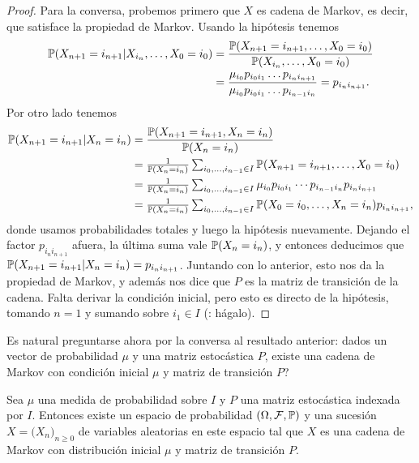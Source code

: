 \begin{proof}
Para la conversa, probemos primero que $X$ es cadena de Markov, es decir, que satisface la propiedad de Markov.
Usando la hipótesis tenemos
\begin{align}
\mathbb{P}(X_{n+1}=i_{n+1}|X_{i_n},\dotsc,X_0=i_0)&=\frac{\mathbb{P}(X_{n+1}=i_{n+1},\dotsc,X_0=i_0)}{\mathbb{P}(X_{i_n},\dotsc,X_0=i_0)}\\
&=\frac{\mu_{i_0}p_{i_0i_1}\dotsc p_{i_{n}i_{n+1}}}{\mu_{i_0}p_{i_0i_1}\dotsc p_{i_{n-1}i_n}}=p_{i_{n}i_{n+1}}.
\end{align}
Por otro lado tenemos
\begin{align}
\mathbb{P}(X_{n+1}=i_{n+1}|X_n=i_n)&=\frac{\mathbb{P}(X_{n+1}=i_{n+1},X_n=i_n)}{\mathbb{P}(X_n=i_n)}\\
&\textstyle=\frac1{\mathbb{P}(X_n=i_n)}\sum_{i_0,\dotsc,i_{n-1}\in I}\mathbb{P}(X_{n+1}=i_{n+1},\dotsc,X_0=i_0)\\
&\textstyle=\frac1{\mathbb{P}(X_n=i_n)}\sum_{i_0,\dotsc,i_{n-1}\in I}\mu_{i_0}p_{i_0i_1}\dotsm p_{i_{n-1}i_{n}}p_{i_{n}i_{n+1}}\\&
\textstyle=\frac1{\mathbb{P}(X_n=i_n)}\sum_{i_0,\dotsc,i_{n-1}\in I}\mathbb{P}(X_0=i_0,\dotsc,X_{n}=i_{n})p_{i_{n}i_{n+1}},
\end{align}
donde usamos probabilidades totales y luego la hipótesis nuevamente.
Dejando el factor $p_{i_{n}i_{n+1}}$ afuera, la última suma vale $\mathbb{P}(X_n=i_n)$, y entonces deducimos que $\mathbb{P}(X_{n+1}=i_{n+1}|X_n=i_n)=p_{i_{n}i_{n+1}}$.
Juntando con lo anterior, esto nos da la propiedad de Markov, y además nos dice que $P$ es la matriz de transición de la cadena.
Falta derivar la condición inicial, pero esto es directo de la hipótesis, tomando $n=1$ y sumando sobre $i_1\in I$ (\uexers: hágalo).
\end{proof}

Es natural preguntarse ahora por la conversa al resultado anterior: dados un vector de probabilidad $\mu$ y una matriz estocástica $P$, existe una cadena de Markov con condición inicial $\mu$ y matriz de transición $P$?

\begin{thm}
Sea $\mu$ una medida de probabilidad sobre $I$ y $P$ una matriz estocástica indexada por $I$.
Entonces existe un espacio de probabilidad $(\Omega,\mathcal{F},\mathbb{P})$ y una sucesión $X=\big(X_n\big)_{n\geq0}$ de variables aleatorias en este espacio tal que $X$ es una cadena de Markov con distribución inicial $\mu$ y matriz de transición $P$.
\end{thm}

